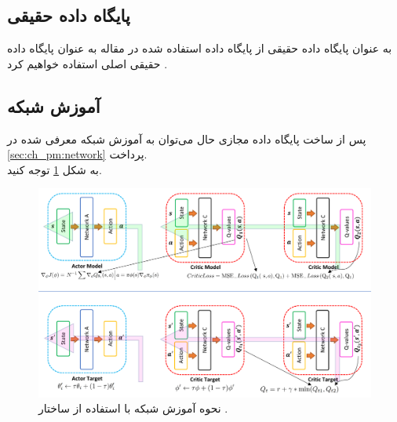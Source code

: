 \subsection[پایگاه داده حقیقی]
{پایگاه داده حقیقی
}
به عنوان پایگاه داده حقیقی از پایگاه داده استفاده شده در مقاله  به عنوان پایگاه داده حقیقی اصلی استفاده خواهیم کرد \cite{davis2016computing}.



\subsection{آموزش شبکه }
پس از ساخت پایگاه داده مجازی حال می‌توان به آموزش شبکه معرفی شده در \ref{sec:ch_pm:network} پرداخت.
\\
به شکل \ref{fig:ch_er:td3} توجه کنید.
\begin{figure}[!ht]
	\centering 
	\includegraphics[width=\textwidth]{img/chaps/er/td3_crop}
	\caption{نحوه آموزش شبکه با استفاده از ساختار  \cite{fujimoto2018addressing}.}    
	\label{fig:ch_er:td3}
\end{figure} 

